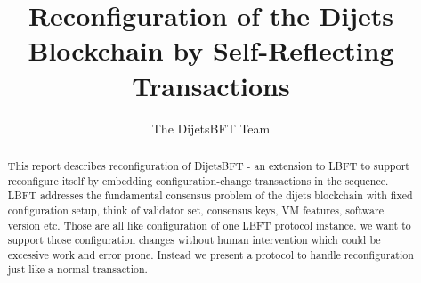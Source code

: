 \documentclass[letterpaper,10pt]{article}
\newcommand{\LBFT}{LBFT\xspace}
\begin{document}
\title{Reconfiguration of the Dijets Blockchain by Self-Reflecting Transactions}
\author{The DijetsBFT Team}
\date{}
\maketitle


\newcommand{\myomit}[1]{}

\begin{abstract}
This report describes reconfiguration of DijetsBFT - an extension to \LBFT to support reconfigure itself
 by embedding configuration-change transactions in the sequence.
\LBFT addresses the fundamental consensus problem of the dijets blockchain with fixed configuration setup,
think of validator set, consensus keys, VM features, software version etc.
Those are all like configuration of one \LBFT protocol instance. we want to support those configuration changes
without human intervention which could be excessive work and error prone. Instead we present
a protocol to handle reconfiguration just like a normal transaction.
\end{abstract}






\begingroup


\endgroup
\end{document}
